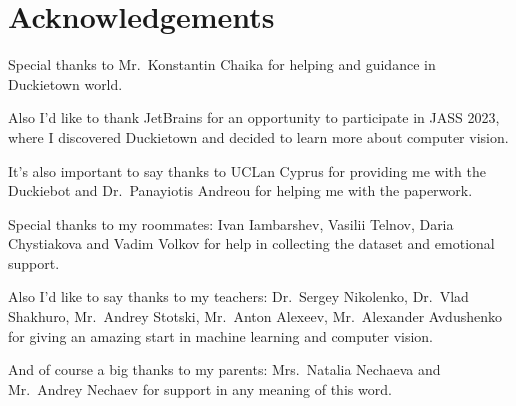 \section*{Acknowledgements}
\setlength{\parskip}{10pt}
\noindent Special thanks to Mr.\ Konstantin Chaika for helping and guidance in Duckietown world.

\noindent Also I'd like to thank JetBrains for an opportunity to participate in JASS 2023, where I discovered Duckietown and decided to learn more about computer vision. 

\noindent It's also important to say thanks to UCLan Cyprus for providing me with the Duckiebot and Dr.\ Panayiotis Andreou for helping me with the paperwork.

\noindent Special thanks to my roommates: Ivan Iambarshev, Vasilii Telnov, Daria Chystiakova and Vadim Volkov for help in collecting the dataset and emotional support.

\noindent Also I'd like to say thanks to my teachers: Dr.\ Sergey Nikolenko, Dr.\ Vlad Shakhuro, Mr.\ Andrey Stotski, Mr.\ Anton Alexeev, Mr.\ Alexander Avdushenko 
for giving an amazing start in machine learning and computer vision.

\noindent And of course a big thanks to my parents: Mrs.\ Natalia Nechaeva and Mr.\ Andrey Nechaev for support in any meaning of this word.